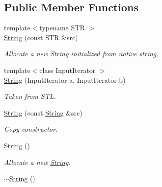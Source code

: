 \subsection*{Public Member Functions}
\begin{DoxyCompactItemize}
\item 
\hypertarget{classGUI_1_1String_a285d02b044048af63eb12dc5a5536de2}{{\footnotesize template$<$typename S\-T\-R $>$ }\\\hyperlink{classGUI_1_1String_a285d02b044048af63eb12dc5a5536de2}{String} (const S\-T\-R \&src)}\label{classGUI_1_1String_a285d02b044048af63eb12dc5a5536de2}

\begin{DoxyCompactList}\small\item\em Allocate a new \hyperlink{classGUI_1_1String}{String} initialized from native string. \end{DoxyCompactList}\item 
\hypertarget{classGUI_1_1String_a39784c812f1b9d98ccb8a70debe5beda}{{\footnotesize template$<$class Input\-Iterator $>$ }\\\hyperlink{classGUI_1_1String_a39784c812f1b9d98ccb8a70debe5beda}{String} (Input\-Iterator a, Input\-Iterator b)}\label{classGUI_1_1String_a39784c812f1b9d98ccb8a70debe5beda}

\begin{DoxyCompactList}\small\item\em Taken from S\-T\-L. \end{DoxyCompactList}\item 
\hypertarget{classGUI_1_1String_a86c043d474eb2c6f8c3e80eaffe0cd77}{\hyperlink{classGUI_1_1String_a86c043d474eb2c6f8c3e80eaffe0cd77}{String} (const \hyperlink{classGUI_1_1String}{String} \&src)}\label{classGUI_1_1String_a86c043d474eb2c6f8c3e80eaffe0cd77}

\begin{DoxyCompactList}\small\item\em Copy-\/constructor. \end{DoxyCompactList}\item 
\hypertarget{classGUI_1_1String_a6249da83463f6309f949a5aab46c4206}{\hyperlink{classGUI_1_1String_a6249da83463f6309f949a5aab46c4206}{String} ()}\label{classGUI_1_1String_a6249da83463f6309f949a5aab46c4206}

\begin{DoxyCompactList}\small\item\em Allocate a new \hyperlink{classGUI_1_1String}{String}. \end{DoxyCompactList}\item 
\hypertarget{classGUI_1_1String_a97ca542a3777d076617434bd3de76356}{\hyperlink{classGUI_1_1String_a97ca542a3777d076617434bd3de76356}{$\sim$\-String} ()}\label{classGUI_1_1String_a97ca542a3777d076617434bd3de76356}


\end{DoxyCompactItemize}
